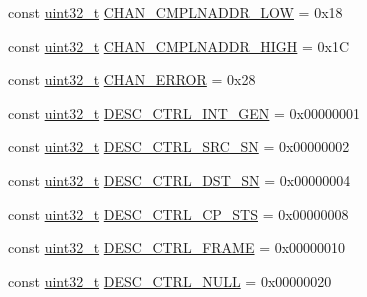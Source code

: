 \begin{DoxyCompactItemize}
\item 
const \hyperlink{Type_8hh_a435d1572bf3f880d55459d9805097f62}{uint32\_\-t} \hyperlink{namespaceCopyEngineReg_aed6b52e6711d8697ca3ceb779ec2d9fc}{CHAN\_\-CMPLNADDR\_\-LOW} = 0x18
\item 
const \hyperlink{Type_8hh_a435d1572bf3f880d55459d9805097f62}{uint32\_\-t} \hyperlink{namespaceCopyEngineReg_ab4915d1760e85a49bed54729ef4fffc7}{CHAN\_\-CMPLNADDR\_\-HIGH} = 0x1C
\item 
const \hyperlink{Type_8hh_a435d1572bf3f880d55459d9805097f62}{uint32\_\-t} \hyperlink{namespaceCopyEngineReg_a82b064c0570a1fb91a35538dd0a6cacf}{CHAN\_\-ERROR} = 0x28
\item 
const \hyperlink{Type_8hh_a435d1572bf3f880d55459d9805097f62}{uint32\_\-t} \hyperlink{namespaceCopyEngineReg_a26862d409e86ed2db165ebf149ea8499}{DESC\_\-CTRL\_\-INT\_\-GEN} = 0x00000001
\item 
const \hyperlink{Type_8hh_a435d1572bf3f880d55459d9805097f62}{uint32\_\-t} \hyperlink{namespaceCopyEngineReg_afbf85224a41aff7ee03f1a3e94f39a8b}{DESC\_\-CTRL\_\-SRC\_\-SN} = 0x00000002
\item 
const \hyperlink{Type_8hh_a435d1572bf3f880d55459d9805097f62}{uint32\_\-t} \hyperlink{namespaceCopyEngineReg_a3b402cd64481eb51c2e6fbdff49246e3}{DESC\_\-CTRL\_\-DST\_\-SN} = 0x00000004
\item 
const \hyperlink{Type_8hh_a435d1572bf3f880d55459d9805097f62}{uint32\_\-t} \hyperlink{namespaceCopyEngineReg_a1f03aaa651abdcdeee5eb25539779d99}{DESC\_\-CTRL\_\-CP\_\-STS} = 0x00000008
\item 
const \hyperlink{Type_8hh_a435d1572bf3f880d55459d9805097f62}{uint32\_\-t} \hyperlink{namespaceCopyEngineReg_af34d1a769bcbb0de27040f506cf720e1}{DESC\_\-CTRL\_\-FRAME} = 0x00000010
\item 
const \hyperlink{Type_8hh_a435d1572bf3f880d55459d9805097f62}{uint32\_\-t} \hyperlink{namespaceCopyEngineReg_a3cd31ebab84f868753db0a75bec634d3}{DESC\_\-CTRL\_\-NULL} = 0x00000020
\end{DoxyCompactItemize}


